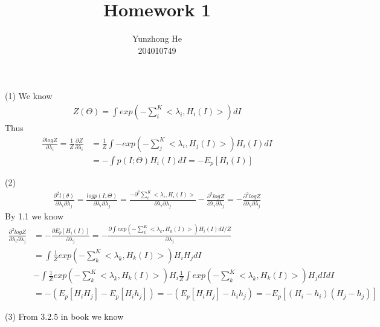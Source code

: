 \documentclass[12pt]{article}
\newenvironment{problem}[2][Problem]{\begin{trivlist}
\item[\hskip \labelsep {\bfseries #1}\hskip \labelsep {\bfseries #2}]}{\end{trivlist}}
\begin{document}
 
 
\title{Homework 1}%
\author{Yunzhong He\\ %
204010749} %
 
\maketitle

\begin{problem}{1.}
\item{(1)}
We know
\begin{align*}
	Z(\Theta) = \int exp(-\sum_i^K <\lambda_i, H_i(I)>) dI
\end{align*}
Thus
\begin{align*}
	\frac{\partial logZ}{\partial \lambda_i} = \frac{1}{Z} \frac{\partial Z}{\partial \lambda_i}
	&= \frac{1}{Z} \int -exp(-\sum_j^K<\lambda_i, H_j(I)>) H_i(I) dI\\
	&= -\int p(I;\Theta)H_i(I)dI = -E_p[H_i(I)]
\end{align*}
\item{(2)}
\begin{align*}
	\frac{\partial^2l(\theta)}{\partial\lambda_i\partial\lambda_j} 
	 = \frac{logp(I;\Theta)}{\partial\lambda_i\partial\lambda_j} 
	 = \frac{-\partial^2\sum_i^K<\lambda_i, H_i(I)>}{\partial\lambda_i\partial\lambda_j} - \frac{\partial^2logZ}{\partial\lambda_i\partial\lambda_j} 
	 = -\frac{\partial^2logZ}{\partial\lambda_i\partial\lambda_j}
\end{align*}
By 1.1 we know
\begin{align*}
	\frac{\partial^2logZ}{\partial\lambda_i\partial\lambda_j}
	&= -\frac{\partial E_p[H_i(I)]}{\partial\lambda_j}
	 = -\frac{\partial\int exp(-\sum_k^K <\lambda_k, H_k(I)>)H_i(I) dI / Z}{\partial\lambda_j}\\
	&= \int \frac{1}{Z} exp(-\sum_k^K <\lambda_k, H_k(I)>) H_i H_j dI \\
	&-\int \frac{1}{Z} exp(-\sum_k^K <\lambda_k, H_k(I)>) H_i \frac{1}{Z} \int exp(-\sum_k^K <\lambda_k, H_k(I)>) H_j dI dI \\
	&= -(E_p[H_iH_j] - E_p[H_i h_j]) = -(E_p[H_iH_j] - h_ih_j) = - E_p[(H_i -h_i)(H_j - h_j)]
\end{align*}
\item{(3)}
From 3.2.5 in book we know

\end{problem}
\end{document}
